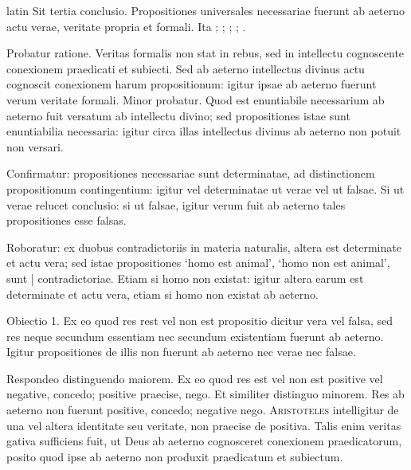 \begin{otherlanguage*}{latin}
\pstart
Sit tertia conclusio. Propositiones universales necessariae fuerunt ab aeterno actu verae, veritate propria et formali. Ita ;  ; ; ; . 
\pend

\pstart
Probatur ratione. Veritas formalis non stat in rebus, sed in intellectu cognoscente conexionem praedicati et subiecti. Sed ab aeterno intellectus divinus actu cognoscit conexionem harum propositionum:
igitur ipsae ab aeterno fuerunt verum veritate formali. Minor probatur. Quod est enuntiabile necessarium ab aeterno fuit versatum ab intellectu divino; sed propositiones istae sunt enuntiabilia necessaria:
igitur circa illas intellectus divinus ab aeterno non potuit non versari. 
\pend

\pstart
Confirmatur:
propositiones necessariae sunt determinatae, ad distinctionem propositionum contingentium:
igitur vel determinatae ut verae vel ut falsae. Si ut verae relucet conclusio:
si ut falsae, igitur verum fuit ab aeterno tales propositiones esse falsas. 
\pend

\pstart
Roboratur:
ex duobus contradictoriis in materia naturalis, altera est determinate et actu vera; sed istae propositiones `homo est animal', `homo non est animal', sunt \textnormal{|} contradictoriae. Etiam si homo non existat:
igitur altera earum est determinate et actu vera, etiam si homo non existat ab aeterno. 
\pend

\pstart
Obiectio 1. Ex eo quod res rest vel non est propositio dicitur vera vel falsa, sed res neque secundum essentiam nec secundum existentiam fuerunt ab aeterno. Igitur propositiones de illis non fuerunt ab aeterno nec verae nec falsae. 
\pend

\pstart
Respondeo distinguendo maiorem. Ex eo quod res est vel non est positive vel negative, concedo; positive praecise, nego. Et similiter distinguo minorem. Res ab aeterno non fuerunt positive, concedo; negative nego. \textsc{Aristoteles} intelligitur de una vel altera identitate seu veritate, non praecise de positiva. Talis enim veritas gativa sufficiens fuit, ut Deus ab aeterno cognosceret conexionem praedicatorum, posito quod ipse ab aeterno non produxit praedicatum et subiectum. 
\pend


\end{otherlanguage*}
